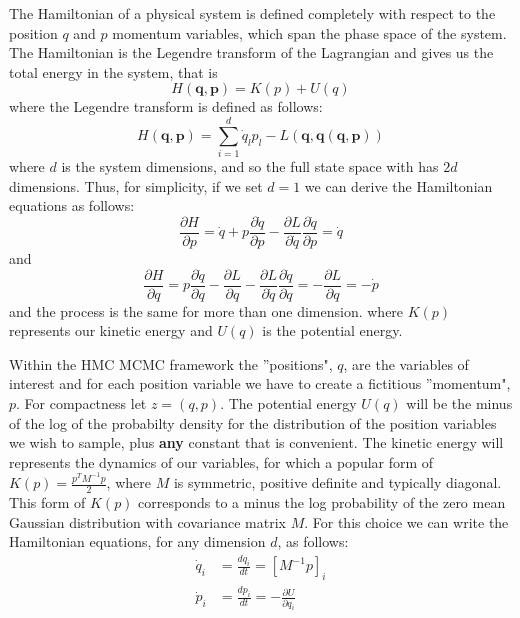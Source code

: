 \documentclass[twoside]{article}
\begin{document}
The Hamiltonian of a physical system is defined completely with respect to the position $q$ and $p$ momentum variables, which span the phase space of the system. The Hamiltonian is the Legendre transform of the Lagrangian and gives us the total energy in the system, that is \begin{equation}
\label{eq:hamreduced}
H(\textbf{q}, \textbf{p})  = K(p) + U(q)
\end{equation}
where the Legendre transform is defined as follows: 
\begin{equation}
\label{eq:hamiltonian}
H(\textbf{q},\textbf{p}) = \sum_{i = 1}^{d}\dot{q}_{l}p_{l} - L(\textbf{q}, \textbf{\.{q}}(\textbf{q}, \textbf{p}))
\end{equation}
where $d$ is the system dimensions, and so the full state space with has $2d$ dimensions.  
Thus, for simplicity, if we set $d = 1$ we can derive the Hamiltonian equations as follows:\begin{equation}
\label{eq:hameq1}
\frac{\partial H}{\partial p} = \dot{q} + p\frac{\partial \dot{q}}{\partial p} - \frac{\partial L}{\partial \dot{q}}\frac{\partial \dot{q}}{\partial p} = \dot{q} \end{equation}
and 
\begin{equation}
\label{eq:hameq2}
\frac{\partial H}{\partial q} = p\frac{\partial \dot{q}}{\partial q} - \frac{\partial L}{\partial q} - \frac{\partial L}{\partial \dot{q}}\frac{\partial \dot{q}}{\partial q} = - \frac{\partial L}{\partial q}= -\dot{p}  \end{equation}
and the process is the same for more than one dimension. 
where $K(p)$ represents our kinetic energy and $U(q)$ is the potential energy.

Within the HMC MCMC framework the ''positions", $q$, are the variables of interest and for each position variable we have to create a fictitious ''momentum", $p$. For compactness let $z = (q,p)$. The potential energy $U(q)$ will be the minus of the log of the probabilty density for the distribution of the position variables we wish to sample, plus \textbf{any} constant that is convenient.  The kinetic energy will represents the dynamics of our variables, for which a popular form of $K(p) = \frac{p^{T} M^{-1} p}{2}$, where $M$ is symmetric, positive definite and typically diagonal. This form of $K(p)$ corresponds to a minus the log probability of the zero mean Gaussian distribution with covariance matrix $M$. For this choice we can write the Hamiltonian equations, for any dimension $d$, as follows:
\begin{align}
\label{eq:ham1neal}
\dot{q}_{i} &= \frac{dq_{i}}{dt} = [M^{-1}p]_{i}\\
\label{eq:ham2neal}
\dot{p}_{i} &= \frac{dp_{i}}{dt} = -\frac{\partial U}{\partial q_{i}}
\end{align}
\end{document}

